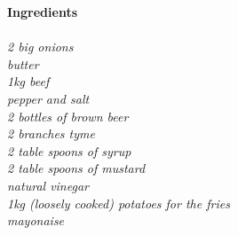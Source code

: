 \documentclass{article}
\newcommand{\sidebarsection}[1]{
    \large\textcolor{darkcol}{\textbf{#1}}
}
\newcommand{\ingredientitem}[1]{
    \vspace{3pt}
    \normalsize\emph{#1}
    \vspace{3pt}
}
\begin{document}
\begin{paracol}{2}
\begin{leftcolumn}
\begin{enumerate}[wide, labelwidth=!, labelindent=0pt]
\end{enumerate}
\end{leftcolumn}

\begin{rightcolumn}

\sidebarsection{Ingredients} \\ \\
\ingredientitem{2 big onions}\\ %
\ingredientitem{butter}\\
\ingredientitem{1kg beef}\\
\ingredientitem{pepper and salt}\\
\ingredientitem{2 bottles of brown beer}\\
\ingredientitem{2 branches tyme}\\
\ingredientitem{2 table spoons of syrup}\\
\ingredientitem{2 table spoons of mustard}\\
\ingredientitem{natural vinegar}\\
\ingredientitem{1kg (loosely cooked) potatoes for the fries}\\
\ingredientitem{mayonaise}\\

\newcommand{\hide}[1]
{}

\hide{
}

\end{rightcolumn}
\clearpage
\end{paracol}
\end{document}
